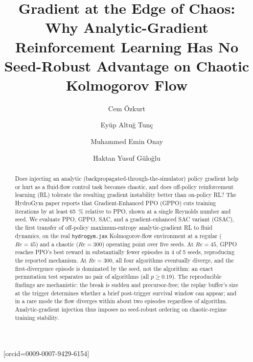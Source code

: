 \documentclass[a4paper,fleqn]{cas-dc}
\renewcommand{\Re}{\mathit{Re}}
\begin{document}
\let\WriteBookmarks\relax
\def\floatpagepagefraction{1}
\def\textpagefraction{.001}


\title[mode = title]{Gradient at the Edge of Chaos: Why Analytic-Gradient
Reinforcement Learning Has No Seed-Robust Advantage on Chaotic Kolmogorov Flow}

\author[1]{Cem \"Ozkurt}
\cormark[1]

\author[1]{Ey\"up Altu\u{g} Tun\c{c}}

\author[1]{Muhammed Emin Onay}

\author[1]{Haktan Yusuf G\"ulo\u{g}lu}[orcid=0009-0007-9429-6154]



\begin{abstract}
Does injecting an analytic
(backpropagated-through-the-simulator) policy gradient help or hurt as a
fluid-flow control task becomes chaotic, and does off-policy reinforcement
learning (RL) tolerate the resulting gradient instability better than
on-policy RL? The HydroGym paper reports that Gradient-Enhanced PPO (GPPO)
cuts training iterations by at least \SI{65}{\percent} relative to PPO, shown
at a single Reynolds number and seed. We evaluate PPO, GPPO, SAC, and a
gradient-enhanced SAC variant (GSAC), the first transfer of off-policy
maximum-entropy analytic-gradient RL to fluid dynamics, on the real
\mbox{\texttt{hydrogym.jax}} Kolmogorov-flow environment at a regular
($\Re=45$) and a chaotic ($\Re=300$) operating point over five seeds. At
$\Re=45$, GPPO reaches PPO's best reward in substantially fewer episodes in 4
of 5 seeds, reproducing the reported mechanism. At $\Re=300$, all four
algorithms eventually diverge, and the first-divergence episode is dominated
by the seed, not the algorithm: an exact permutation test separates no pair
of algorithms (all $p\ge 0.19$). The reproducible findings are mechanistic:
the break is sudden and precursor-free; the replay buffer's size at the
trigger determines whether a brief post-trigger survival window can appear;
and in a rare mode the flow diverges within about two episodes regardless of
algorithm. Analytic-gradient injection thus imposes no seed-robust ordering
on chaotic-regime training stability.
\end{abstract}
\end{document}
